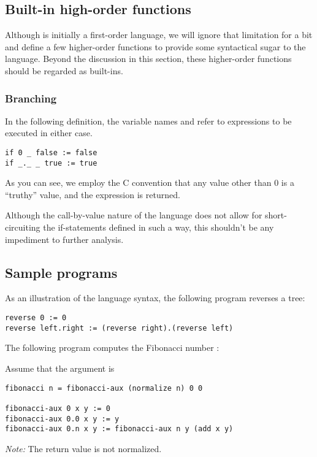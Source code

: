 \subsection{Built-in high-order
functions}\label{section:language-higher-order-built-ins}

Although  is initially a first-order language, we will ignore that
limitation for a bit and define a few higher-order functions to provide some
syntactical sugar to the language. Beyond the discussion in this section, these
higher-order functions should be regarded as  built-ins.

\subsubsection{Branching}

In the following definition, the variable names  and 
refer to expressions to be executed in either case.

\begin{verbatim}
if 0 _ false := false
if _._ _ true := true
\end{verbatim}

As you can see, we employ the C convention that any value other than $0$ is a
``truthy'' value, and the expression  is returned.

Although the call-by-value nature of the language does not allow for
short-circuiting the if-statements defined in such a way, this shouldn't be any
impediment to further analysis.

\subsection{Sample programs}\label{section:d-samples}

As an illustration of the language syntax, the following program reverses a tree:

\begin{verbatim}
reverse 0 := 0
reverse left.right := (reverse right).(reverse left)
\end{verbatim}

The following program computes the Fibonacci number :

Assume that the argument is

\begin{verbatim}
fibonacci n = fibonacci-aux (normalize n) 0 0

fibonacci-aux 0 x y := 0
fibonacci-aux 0.0 x y := y
fibonacci-aux 0.n x y := fibonacci-aux n y (add x y)
\end{verbatim}

\emph{Note:} The return value is not normalized.


